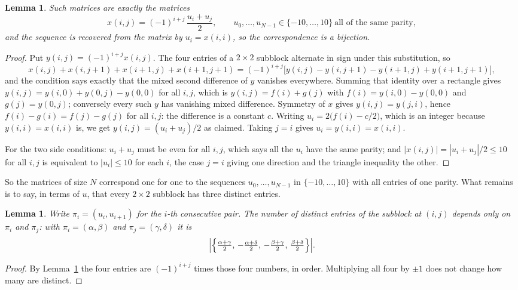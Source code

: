 \documentclass[11pt,a4paper]{article}
\theoremstyle{plain}
\newtheorem{lemma}[theorem]{Lemma}
\theoremstyle{definition}
\begin{document}
\begin{lemma}\label{lem:solve}
Such matrices are exactly the matrices
\[
x(i,j)=(-1)^{i+j}\,\frac{u_i+u_j}{2},
\qquad u_0,\dots,u_{N-1}\in\{-10,\dots,10\}\ \text{all of the same parity},
\]
and the sequence is recovered from the matrix by $u_i=x(i,i)$, so the correspondence is a
bijection.
\end{lemma}

\begin{proof}
Put $y(i,j)=(-1)^{i+j}x(i,j)$. The four entries of a $2\times2$ subblock alternate in sign
under this substitution, so
\[
x(i,j)+x(i,j{+}1)+x(i{+}1,j)+x(i{+}1,j{+}1)
=(-1)^{i+j}\bigl[y(i,j)-y(i,j{+}1)-y(i{+}1,j)+y(i{+}1,j{+}1)\bigr],
\]
and the condition says exactly that the mixed second difference of $y$ vanishes everywhere.
Summing that identity over a rectangle gives
$y(i,j)=y(i,0)+y(0,j)-y(0,0)$ for all $i,j$, which is $y(i,j)=f(i)+g(j)$ with
$f(i)=y(i,0)-y(0,0)$ and $g(j)=y(0,j)$; conversely every such $y$ has vanishing mixed
difference. Symmetry of $x$ gives $y(i,j)=y(j,i)$, hence $f(i)-g(i)=f(j)-g(j)$ for all $i,j$:
the difference is a constant $c$. Writing $u_i=2\bigl(f(i)-c/2\bigr)$, which is an integer
because $y(i,i)=x(i,i)$ is, we get $y(i,j)=(u_i+u_j)/2$ as claimed. Taking $j=i$ gives
$u_i=y(i,i)=x(i,i)$.

For the two side conditions: $u_i+u_j$ must be even for all $i,j$, which says all the $u_i$ have
the same parity; and $|x(i,j)|=|u_i+u_j|/2\le10$ for all $i,j$ is equivalent to $|u_i|\le10$
for each $i$, the case $j=i$ giving one direction and the triangle inequality the other.
\end{proof}

So the matrices of size $N$ correspond one for one to the sequences $u_0,\dots,u_{N-1}$ in
$\{-10,\dots,10\}$ with all entries of one parity. What remains is to say, in terms of $u$,
that every $2\times2$ subblock has three distinct entries.

\begin{lemma}\label{lem:block}
Write $\pi_i=(u_i,u_{i+1})$ for the $i$-th consecutive pair. The number of distinct entries of
the subblock at $(i,j)$ depends only on $\pi_i$ and $\pi_j$: with $\pi_i=(\alpha,\beta)$ and
$\pi_j=(\gamma,\delta)$ it is
\[
\Bigl|\Bigl\{\tfrac{\alpha+\gamma}{2},\,-\tfrac{\alpha+\delta}{2},\,
-\tfrac{\beta+\gamma}{2},\,\tfrac{\beta+\delta}{2}\Bigr\}\Bigr| .
\]
\end{lemma}

\begin{proof}
By Lemma~\ref{lem:solve} the four entries are $(-1)^{i+j}$ times those four numbers, in
order. Multiplying all four by $\pm1$ does not change how many are distinct.
\end{proof}
\end{document}
